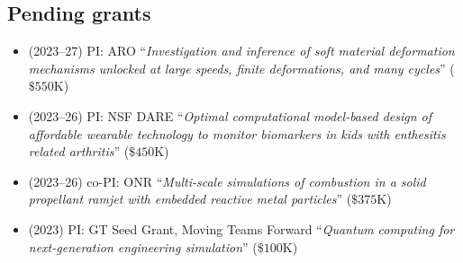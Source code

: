 \subsection{Pending grants}

\begin{itemize}
    \item (2023--27) PI: ARO ``\textit{Investigation and inference of soft material deformation mechanisms unlocked at large speeds, finite deformations, and many cycles}'' ($\$550$K)
    \item (2023--26) PI: NSF DARE ``\textit{Optimal computational model-based design of affordable wearable technology to monitor biomarkers in kids with enthesitis related arthritis}'' ($\$450$K)
    \item (2023--26) co-PI: ONR ``\textit{Multi-scale simulations of combustion in a solid propellant ramjet with embedded reactive metal particles}'' ($\$375$K)
    \item (2023) PI: GT Seed Grant, Moving Teams Forward ``\textit{Quantum computing for next-generation engineering simulation}'' ($\$100$K)
\end{itemize}
